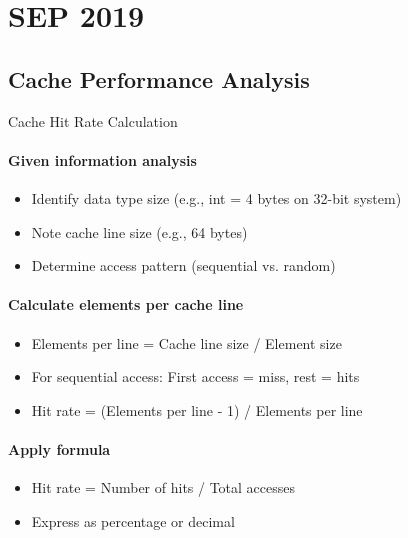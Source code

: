 \section{SEP 2019}

\subsection{Cache Performance Analysis}

\begin{KR}{Cache Hit Rate Calculation}
    \paragraph{Given information analysis}
    \begin{itemize}
        \item Identify data type size (e.g., int = 4 bytes on 32-bit system)
        \item Note cache line size (e.g., 64 bytes)
        \item Determine access pattern (sequential vs. random)
    \end{itemize}
    
    \paragraph{Calculate elements per cache line}
    \begin{itemize}
        \item Elements per line = Cache line size / Element size
        \item For sequential access: First access = miss, rest = hits
        \item Hit rate = (Elements per line - 1) / Elements per line
    \end{itemize}
    
    \paragraph{Apply formula}
    \begin{itemize}
        \item Hit rate = Number of hits / Total accesses
        \item Express as percentage or decimal
    \end{itemize}
\end{KR}

